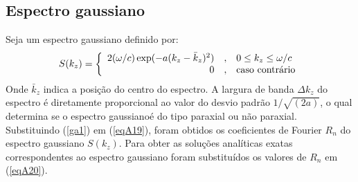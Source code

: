 \subsection{Espectro gaussiano} Seja um espectro gaussiano definido por:
\begin{equation}\label{ga1}
S(k_{z})= \left\{
\begin{array}{rcl}
  2(\omega/c)\exp(-a(k_z - \bar{k}_z)^2) & , & 0\leq k_{z}\leq \omega/c\\
     0 &  , & $caso contr\'ario$
\end{array}
\right.
\end{equation}
Onde $\bar{k}_z$ indica a posi\c{c}\~ao do centro do espectro. A largura de banda $\Delta k_z$ do espectro \'e diretamente proporcional ao valor do desvio padr\~ao $1/\sqrt{(2a)}$, o qual determina se o espectro gaussiano\'e do tipo paraxial ou n\~ao paraxial.  \\
Substituindo (\ref{ga1}) em (\ref{eqA19}), foram obtidos os coeficientes de Fourier $R_n$ do espectro gaussiano $S(k_z)$. Para obter as solu\c{c}\~oes anal\'iticas exatas correspondentes ao espectro gaussiano foram substitu\'idos os valores de $R_n$ em (\ref{eqA20}).\\
